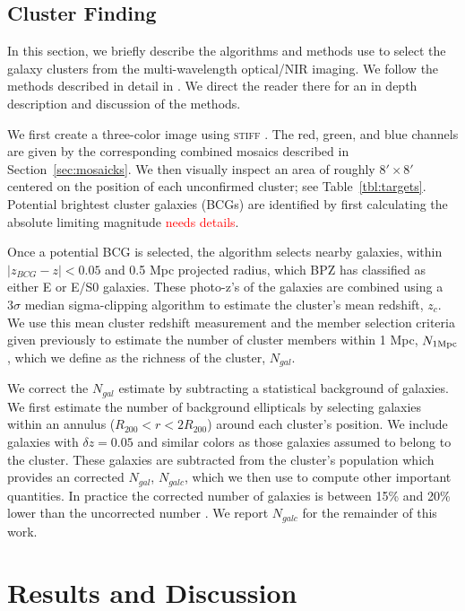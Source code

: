 \documentclass[apj, revtex4]{emulateapj}
\newcommand{\editorial}[1]{\textcolor{red}{#1}}
\begin{document}
\subsection{Cluster Finding}
In this section, we briefly describe the algorithms and methods use to select the galaxy clusters from the multi-wavelength optical/NIR imaging. We follow the methods described in detail in \cite{Menanteau2009a, Menanteau2010}. We direct the reader there for an in depth description and discussion of the methods.  

We first create a three-color image using \textsc{stiff} \citep{Bertin2011}. The red, green, and blue channels are given by the corresponding combined mosaics described in Section~\ref{sec:mosaicks}. We then visually inspect an area of roughly $8' \times 8'$ centered on the position of each unconfirmed cluster; see Table~\ref{tbl:targets}. Potential brightest cluster galaxies (BCGs) are identified by first calculating the absolute limiting magnitude \editorial{needs details}.

Once a potential BCG is selected, the algorithm selects nearby galaxies, within $|z_{BCG} - z| < 0.05$ and 0.5 Mpc projected radius, which BPZ has classified as either E or E/S0 galaxies. These photo-z's of the galaxies are combined using a $3\sigma$ median sigma-clipping algorithm to estimate the cluster's mean redshift, $z_c$. We use this mean cluster redshift measurement and the member selection criteria given previously to estimate the number of cluster members within 1 Mpc, $N_{1\rm Mpc}$, which we define as the richness of the cluster, $N_{gal}$.   

We correct the $N_{gal}$ estimate by subtracting a statistical background of galaxies. We first estimate the number of background ellipticals by selecting galaxies within an annulus ($R_{200} <r < 2R_{200}$) around each cluster's position. We include galaxies with $\delta z = 0.05$ and similar colors as those galaxies assumed to belong to the cluster. These galaxies are subtracted from the cluster's population which provides an corrected $N_{gal}$, $N_{galc}$, which we then use to compute other important quantities. In practice the corrected number of galaxies is between 15\% and 20\% lower than the uncorrected number \citep{Menanteau2010}. We report $N_{galc}$ for the remainder of this work.


\section{Results and Discussion}\label{sec:results}
\end{document}

